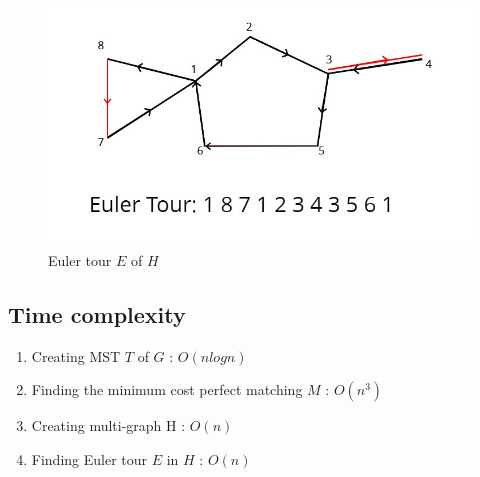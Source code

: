 \begin{figure}[h]
    \centering
    \caption{Euler tour $E$ of $H$}
    \includegraphics[scale=0.3]{3.jpg}
\end{figure}
\subsection{Time complexity}
\begin{enumerate}
    \item {Creating MST $T$ of $G$ : $O(nlogn)$}
    \item {Finding the minimum cost perfect matching $M$ : $O(n^3)$}
    \item {Creating multi-graph H : $O(n)$}
    \item {Finding Euler tour $E$ in $H$ : $O(n)$}
\end{enumerate}
